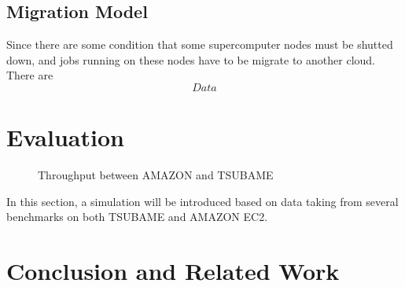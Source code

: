 \documentclass[JIP,draft]{ipsj}
\begin{document}
\subsection{Migration Model}
Since there are some condition that some supercomputer nodes must be shutted down, and jobs running on these nodes have to be migrate to another cloud. There are 
\begin{equation}
	Data	
\end{equation}

\section{Evaluation}
\begin{figure}[tb]
	\centering
	\caption{Throughput between AMAZON and TSUBAME}
	\label{Throughput between AMAZON and TSUBAME}
\end{figure}

In this section, a simulation will be introduced based on data taking from several benchmarks on both TSUBAME and AMAZON EC2.

\section{Conclusion and Related Work}
\end{document}
